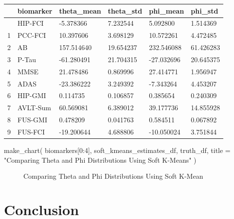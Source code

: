 \documentclass[
  letterpaper,
  DIV=11,
  numbers=noendperiod]{scrreprt}
\newenvironment{Shaded}{\begin{snugshade}}{\end{snugshade}}
\newcommand{\DecValTok}[1]{\textcolor[rgb]{0.68,0.00,0.00}{#1}}
\newcommand{\NormalTok}[1]{\textcolor[rgb]{0.00,0.23,0.31}{#1}}
\newcommand{\OperatorTok}[1]{\textcolor[rgb]{0.37,0.37,0.37}{#1}}
\newcommand{\StringTok}[1]{\textcolor[rgb]{0.13,0.47,0.30}{#1}}
\begin{document}
\begin{longtable}[]{@{}llllll@{}}
\toprule\noalign{}
& biomarker & theta\_mean & theta\_std & phi\_mean & phi\_std \\
\midrule\noalign{}
\endhead
\bottomrule\noalign{}
\endlastfoot
0 & HIP-FCI & -5.378366 & 7.232544 & 5.092800 & 1.514369 \\
1 & PCC-FCI & 10.397606 & 3.698129 & 10.572261 & 4.472485 \\
2 & AB & 157.514640 & 19.654237 & 232.546088 & 61.426283 \\
3 & P-Tau & -61.280491 & 21.704315 & -27.032696 & 20.645375 \\
4 & MMSE & 21.478486 & 0.869996 & 27.414771 & 1.956947 \\
5 & ADAS & -23.386222 & 3.249392 & -7.343264 & 4.453207 \\
6 & HIP-GMI & 0.114735 & 0.106857 & 0.385654 & 0.240309 \\
7 & AVLT-Sum & 60.569081 & 6.389012 & 39.177736 & 14.855928 \\
8 & FUS-GMI & 0.478209 & 0.041763 & 0.584511 & 0.067892 \\
9 & FUS-FCI & -19.200644 & 4.688806 & -10.050024 & 3.751844 \\
\end{longtable}

\begin{Shaded}
\begin{Highlighting}[]
\NormalTok{make\_chart(}
\NormalTok{    biomarkers[}\DecValTok{0}\NormalTok{:}\DecValTok{4}\NormalTok{], }
\NormalTok{    soft\_kmeans\_estimates\_df, }
\NormalTok{    truth\_df, }
\NormalTok{    title }\OperatorTok{=} \StringTok{"Comparing Theta and Phi Distributions Using Soft K{-}Means"}
\NormalTok{)}
\end{Highlighting}
\end{Shaded}

\begin{figure}[H]


\caption{\label{fig-estdistparamsskm}Comparing Theta and Phi
Distributions Using Soft K-Mean}

\end{figure}%

\section{Conclusion}\label{conclusion}
\end{document}
